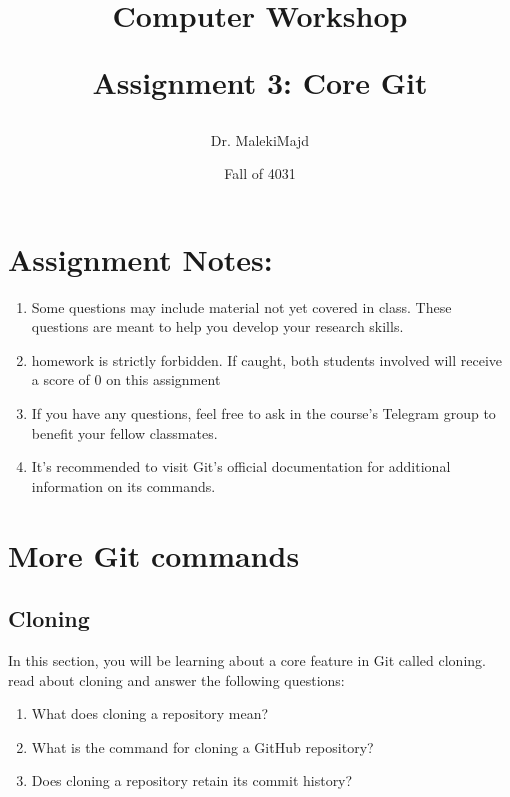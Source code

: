\documentclass{article}
\title{Computer Workshop

Assignment 3: Core Git}
\date{Fall of 4031}
\author{Dr. MalekiMajd}
\begin{document}
\pagestyle{fancy}

\fancyhead[L]{ \thepage}

\maketitle
{}

\newpage

\tableofcontents


\newpage

\section*{Assignment Notes:}

\begin{enumerate}
    \item Some questions may include material not yet covered in class. These
questions are meant to help you develop your research skills.

    \item homework is strictly forbidden. If caught, both students involved will receive a score of 0 on this assignment
    
    \item If you have any questions, feel free to ask in the course’s Telegram group
to benefit your fellow classmates.

\item It’s recommended to visit Git’s official documentation for additional information on its commands.

\end{enumerate}

\newpage

\section{More Git commands}

\subsection{Cloning}
In this section, you will be learning about a core feature in Git called cloning.
read about cloning and answer the following questions:


\begin{enumerate}
    \item What does cloning a repository mean?
    \item What is the command for cloning a GitHub repository?
    \item Does cloning a repository retain its commit history?
\end{enumerate}
\end{document}

